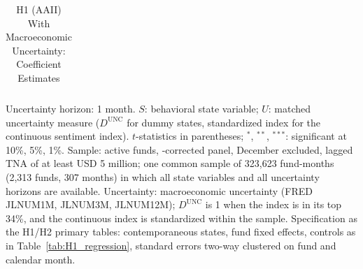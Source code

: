 \begin{table}[!htbp]
{\begin{tabular}{lccc}
\bottomrule
\end{tabular}%
}\sbefit
\setlength{\tabletempwidth}{\wd\tabletempbox}
\ifdim\tabletempwidth>\linewidth\setlength{\tabletempwidth}{\linewidth}\fi
\begin{minipage}{\tabletempwidth}
\captionsetup{width=\linewidth}
\caption{H1 (AAII) With Macroeconomic Uncertainty: Coefficient Estimates}\label{tab:unc_AAII}
\ifdim\wd\tabletempbox>\linewidth
  \resizebox{\linewidth}{!}{\usebox{\tabletempbox}}
\else
  \usebox{\tabletempbox}
\fi
\par\medskip
\begin{singlespace}\tablefont\noindent
Uncertainty horizon: 1 month. $S$: behavioral state variable; $U$: matched uncertainty measure ($D^{\text{UNC}}$ for dummy states, standardized index for the continuous sentiment index). $t$-statistics in parentheses; $^{*}$, $^{**}$, $^{***}$: significant at 10\%, 5\%, 1\%. Sample: active funds, \textcite{Evans2010}-corrected panel, December excluded, lagged TNA of at least USD 5 million; one common sample of 323,623 fund-months (2,313 funds, 307 months) in which all state variables and all uncertainty horizons are available. Uncertainty: \textcite{JuradoLudvigsonNg2015} macroeconomic uncertainty (FRED JLNUM1M, JLNUM3M, JLNUM12M); $D^{\text{UNC}}$ is 1 when the index is in its top 34\%, and the continuous index is standardized within the sample. Specification as the H1/H2 primary tables: contemporaneous states, fund fixed effects, controls as in Table~\ref{tab:H1_regression}, standard errors two-way clustered on fund and calendar month.
\end{singlespace}
\end{minipage}
\end{table}

